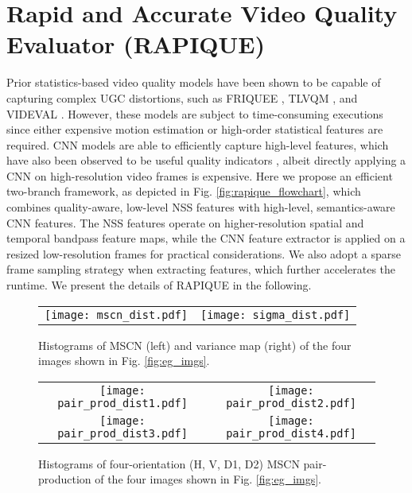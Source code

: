 \documentclass[transmag]{IEEEtran}
\begin{document}
\section{Rapid and Accurate Video Quality Evaluator (RAPIQUE)}
\label{sec:rapique}

Prior statistics-based video quality models have been shown to be capable of capturing complex UGC distortions, such as FRIQUEE \cite{ghadiyaram2017perceptual}, TLVQM \cite{korhonen2019two}, and VIDEVAL \cite{tu2020ugc}. However, these models are subject to time-consuming executions since either expensive motion estimation or high-order statistical features are required. CNN models are able to efficiently capture high-level features, which have also been observed to be useful quality indicators \cite{li2019quality}, albeit directly applying a CNN on high-resolution video frames is expensive. Here we propose an efficient two-branch framework, as depicted in Fig. \ref{fig:rapique_flowchart}, which combines quality-aware, low-level NSS features with high-level, semantics-aware CNN features. The NSS features operate on higher-resolution spatial and temporal bandpass feature maps, while the CNN feature extractor is applied on a resized low-resolution frames for practical considerations. We also adopt a sparse frame sampling strategy when extracting features, which further accelerates the runtime. We present the details of RAPIQUE in the following.

\begin{figure}[!t]
\centering
\footnotesize
\def\xheight{0.485}
\setlength{\tabcolsep}{1pt}
\begin{tabular}{cc}
\texttt{[image: mscn\_dist.pdf]} &
\texttt{[image: sigma\_dist.pdf]} \\
\end{tabular}
\caption{Histograms of MSCN (left) and variance map (right) of the four images shown in Fig. \ref{fig:eg_imgs}.}
\label{fig:mscn_sigma}
\end{figure}

\begin{figure}[!t]
\centering
\footnotesize
\def\xheight{0.485}
\setlength{\tabcolsep}{1pt}
\begin{tabular}{cc}
\texttt{[image: pair\_prod\_dist1.pdf]} &
\texttt{[image: pair\_prod\_dist2.pdf]} \\
\texttt{[image: pair\_prod\_dist3.pdf]} &
\texttt{[image: pair\_prod\_dist4.pdf]} \\
\end{tabular}
\caption{Histograms of four-orientation (H, V, D1, D2) MSCN pair-production of the four images shown in Fig. \ref{fig:eg_imgs}.}
\label{fig:pair_prod}
\end{figure}
\end{document}
